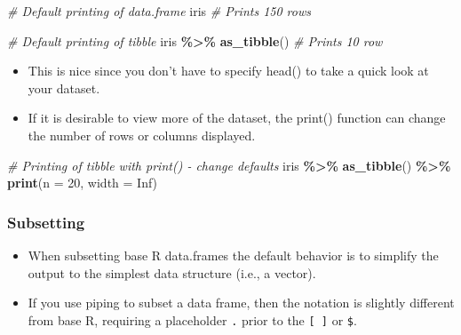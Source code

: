 \documentclass[
]{book}
\newenvironment{Shaded}{\begin{snugshade}}{\end{snugshade}}
\newcommand{\AttributeTok}[1]{\textcolor[rgb]{0.13,0.29,0.53}{#1}}
\newcommand{\CommentTok}[1]{\textcolor[rgb]{0.56,0.35,0.01}{\textit{#1}}}
\newcommand{\ConstantTok}[1]{\textcolor[rgb]{0.56,0.35,0.01}{#1}}
\newcommand{\DecValTok}[1]{\textcolor[rgb]{0.00,0.00,0.81}{#1}}
\newcommand{\FunctionTok}[1]{\textcolor[rgb]{0.13,0.29,0.53}{\textbf{#1}}}
\newcommand{\NormalTok}[1]{#1}
\newcommand{\SpecialCharTok}[1]{\textcolor[rgb]{0.81,0.36,0.00}{\textbf{#1}}}
\newcommand{\StringTok}[1]{\textcolor[rgb]{0.31,0.60,0.02}{#1}}
\providecommand{\tightlist}{%
  \setlength{\itemsep}{0pt}\setlength{\parskip}{0pt}}
\begin{document}
\begin{Shaded}
\begin{Highlighting}[]
\CommentTok{\# Default printing of data.frame}
\NormalTok{iris }\CommentTok{\# Prints 150 rows}

\CommentTok{\# Default printing of tibble}
\NormalTok{iris }\SpecialCharTok{\%\textgreater{}\%}
  \FunctionTok{as\_tibble}\NormalTok{() }\CommentTok{\# Prints 10 row}
\end{Highlighting}
\end{Shaded}

\begin{itemize}
\tightlist
\item
  This is nice since you don't have to specify head() to take a quick look at your dataset.
\item
  If it is desirable to view more of the dataset, the print() function can change the number of rows or columns displayed.
\end{itemize}

\begin{Shaded}
\begin{Highlighting}[]
\CommentTok{\# Printing of tibble with print() {-} change defaults}
\NormalTok{iris }\SpecialCharTok{\%\textgreater{}\%}
  \FunctionTok{as\_tibble}\NormalTok{() }\SpecialCharTok{\%\textgreater{}\%}
  \FunctionTok{print}\NormalTok{(}\AttributeTok{n =} \DecValTok{20}\NormalTok{, }\AttributeTok{width =} \ConstantTok{Inf}\NormalTok{)}
\end{Highlighting}
\end{Shaded}

\subsubsection{Subsetting}\label{subsetting}

\begin{itemize}
\tightlist
\item
  When subsetting base R data.frames the default behavior is to simplify the output to the simplest data structure (i.e., a vector).
\item
  If you use piping to subset a data frame, then the notation is slightly different from base R, requiring a placeholder \texttt{.} prior to the \texttt{{[}\ {]}} or \texttt{\$}.
\end{itemize}

\begin{Shaded}
\end{Shaded}
\end{document}
